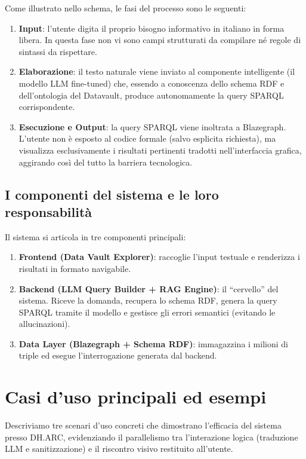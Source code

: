 \documentclass[12pt,a4paper,oneside]{book}
\begin{document}
        Come illustrato nello schema, le fasi del processo sono le seguenti:
        \begin{enumerate}
            \item \textbf{Input}: l'utente digita il proprio bisogno informativo in italiano in forma libera. In questa fase non vi sono campi strutturati da compilare né regole di sintassi da rispettare.
            \item \textbf{Elaborazione}: il testo naturale viene inviato al componente intelligente (il modello LLM fine-tuned) che, essendo a conoscenza dello schema RDF e dell'ontologia del Datavault, produce autonomamente la query SPARQL corrispondente.
            \item \textbf{Esecuzione e Output}: la query SPARQL viene inoltrata a Blazegraph. L'utente non è esposto al codice formale (salvo esplicita richiesta), ma visualizza esclusivamente i risultati pertinenti tradotti nell'interfaccia grafica, aggirando così del tutto la barriera tecnologica.
        \end{enumerate}

    \subsection{I componenti del sistema e le loro responsabilità}\label{subsec:componenti}
        Il sistema si articola in tre componenti principali:
        \begin{enumerate}
            \item \textbf{Frontend (Data Vault Explorer)}: raccoglie l'input testuale e renderizza i risultati in formato navigabile.
            \item \textbf{Backend (LLM Query Builder + RAG Engine)}: il ``cervello'' del sistema. Riceve la domanda, recupera lo schema RDF, genera la query SPARQL tramite il modello e gestisce gli errori semantici (evitando le allucinazioni).
            \item \textbf{Data Layer (Blazegraph + Schema RDF)}: immagazzina i milioni di triple ed esegue l'interrogazione generata dal backend.
        \end{enumerate}

\section{Casi d'uso principali ed esempi}\label{sec:casiduso}

    Descriviamo tre scenari d'uso concreti che dimostrano l'efficacia del sistema presso DH.ARC, evidenziando il parallelismo tra l'interazione logica (traduzione LLM e sanitizzazione) e il riscontro visivo restituito all'utente.\@
\newpage
\end{document}
